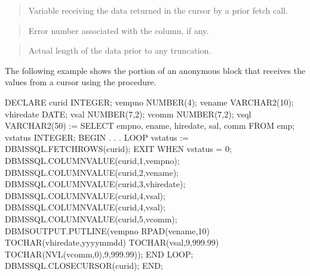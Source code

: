 \documentclass[letterpaper,10pt,english,openany,oneside]{sphinxmanual}
\begin{document}
\begin{quote}

Variable receiving the data returned in the cursor by a prior fetch
call.
\end{quote}

\begin{quote}

Error number associated with the column, if any.
\end{quote}

\begin{quote}

Actual length of the data prior to any truncation.
\end{quote}


The following example shows the portion of an anonymous block that
receives the values from a cursor using the  procedure.

%
\begin{sphinxVerbatim}[commandchars=\\\{\}]
DECLARE
    curid           INTEGER;
    v\PYGZus{}empno         NUMBER(4);
    v\PYGZus{}ename         VARCHAR2(10);
    v\PYGZus{}hiredate      DATE;
    v\PYGZus{}sal           NUMBER(7,2);
    v\PYGZus{}comm          NUMBER(7,2);
    v\PYGZus{}sql           VARCHAR2(50) := \PYGZsq{}SELECT empno, ename, hiredate, sal, \PYGZsq{} \textbar{}\textbar{}
                                    \PYGZsq{}comm FROM emp\PYGZsq{};
    v\PYGZus{}status        INTEGER;
BEGIN
            .
            .
            .
    LOOP
        v\PYGZus{}status := DBMS\PYGZus{}SQL.FETCH\PYGZus{}ROWS(curid);
        EXIT WHEN v\PYGZus{}status = 0;
        DBMS\PYGZus{}SQL.COLUMN\PYGZus{}VALUE(curid,1,v\PYGZus{}empno);
        DBMS\PYGZus{}SQL.COLUMN\PYGZus{}VALUE(curid,2,v\PYGZus{}ename);
        DBMS\PYGZus{}SQL.COLUMN\PYGZus{}VALUE(curid,3,v\PYGZus{}hiredate);
        DBMS\PYGZus{}SQL.COLUMN\PYGZus{}VALUE(curid,4,v\PYGZus{}sal);
        DBMS\PYGZus{}SQL.COLUMN\PYGZus{}VALUE(curid,4,v\PYGZus{}sal);
        DBMS\PYGZus{}SQL.COLUMN\PYGZus{}VALUE(curid,5,v\PYGZus{}comm);
        DBMS\PYGZus{}OUTPUT.PUT\PYGZus{}LINE(v\PYGZus{}empno \textbar{}\textbar{} \PYGZsq{}   \PYGZsq{} \textbar{}\textbar{} RPAD(v\PYGZus{}ename,10) \textbar{}\textbar{} \PYGZsq{}  \PYGZsq{} \textbar{}\textbar{}
            TO\PYGZus{}CHAR(v\PYGZus{}hiredate,\PYGZsq{}yyyy\PYGZhy{}mm\PYGZhy{}dd\PYGZsq{}) \textbar{}\textbar{} \PYGZsq{} \PYGZsq{} \textbar{}\textbar{}
            TO\PYGZus{}CHAR(v\PYGZus{}sal,\PYGZsq{}9,999.99\PYGZsq{}) \textbar{}\textbar{} \PYGZsq{} \PYGZsq{} \textbar{}\textbar{}
            TO\PYGZus{}CHAR(NVL(v\PYGZus{}comm,0),\PYGZsq{}9,999.99\PYGZsq{}));
    END LOOP;
    DBMS\PYGZus{}SQL.CLOSE\PYGZus{}CURSOR(curid);
END;
\end{sphinxVerbatim}
\end{document}
